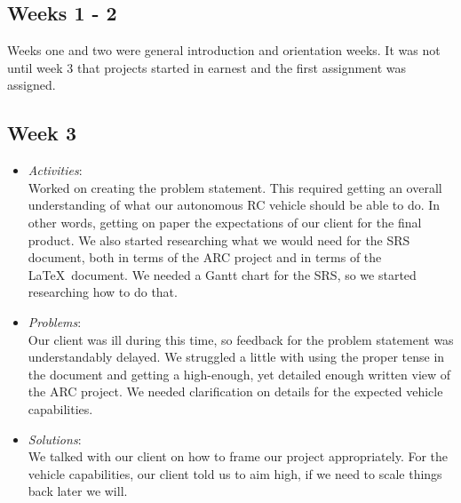 \documentclass[compsoc,draftclsnofoot,onecolumn,10pt]{IEEEtran}
\begin{document}
\subsection{Weeks 1 - 2}
Weeks one and two were general introduction and orientation weeks. It was
not until week 3 that projects started in earnest and the first assignment was
assigned.

\subsection{Week 3}
	\begin{itemize}
        \item \textit{Activities}:\\
            Worked on creating the problem statement. This required getting an
            overall understanding of what our autonomous RC vehicle should be able
            to do. In other words, getting on paper the expectations of our client
            for the final product. We also started researching what we would need
            for the SRS document, both in terms of the ARC project and in terms of
            the \LaTeX~document. We needed a Gantt chart for the SRS, so we started
            researching how to do that.

        \item \textit{Problems}:\\
            Our client was ill during this time, so feedback for the problem
            statement was understandably delayed. We struggled a little with using
            the proper tense in the document and getting a high-enough, yet detailed
            enough written view of the ARC project. We needed clarification on
            details for the expected vehicle capabilities.

        \item \textit{Solutions}:\\
            We talked with our client on how to frame our project appropriately.
            For the vehicle capabilities, our client told us to aim high, if we
            need to scale things back later we will.

	\end{itemize}
 
\end{document}
